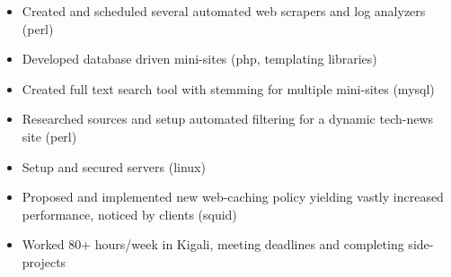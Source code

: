 \documentclass[10pt]{article}
\begin{document}
\begin{itemize}
    \begin{itemize}
    \item Created and scheduled several automated web scrapers and log analyzers (perl)
    \item Developed database driven mini-sites (php, templating libraries)
    \item Created full text search tool with stemming for multiple mini-sites (mysql)
    \item Researched sources and setup automated filtering for a dynamic tech-news site (perl)
    \item Setup and secured servers (linux)
    \item Proposed and implemented new web-caching policy yielding vastly increased performance, noticed by clients (squid)
    \item Worked 80+ hours/week in Kigali, meeting deadlines and completing side-projects
    \end{itemize}

\end{itemize} %
\end{document}
